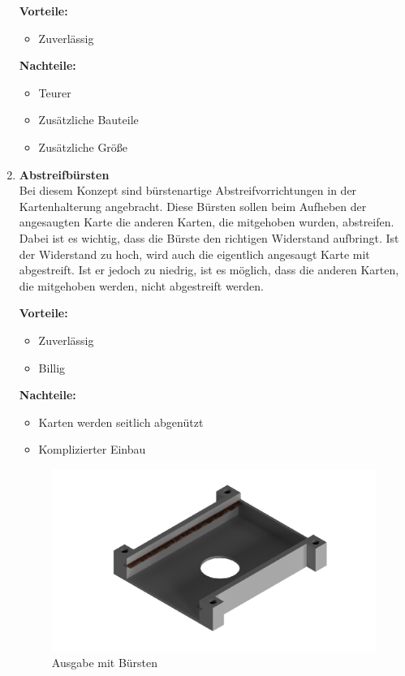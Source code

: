 \begin{enumerate}
    \textbf{Vorteile:}
    \begin{itemize}
        \item Zuverlässig
    \end{itemize}
    \textbf{Nachteile:}
    \begin{itemize}
        \item Teurer
        \item Zusätzliche Bauteile
        \item Zusätzliche Größe
    \end{itemize}



    \item \textbf{Abstreifbürsten}\\
    Bei diesem Konzept sind bürstenartige Abstreifvorrichtungen in der Kartenhalterung angebracht.
    Diese Bürsten sollen beim Aufheben der
    angesaugten Karte die anderen Karten, die mitgehoben wurden, abstreifen.
    Dabei ist es wichtig, dass die Bürste den richtigen Widerstand aufbringt.
    Ist der Widerstand zu hoch, wird auch die eigentlich angesaugt Karte mit abgestreift.
    Ist er jedoch zu niedrig, ist es möglich, dass die anderen Karten,
    die mitgehoben werden, nicht abgestreift werden.

    \textbf{Vorteile:}
    \begin{itemize}
        \item Zuverlässig
        \item Billig
    \end{itemize}
    \textbf{Nachteile:}
    \begin{itemize}
        \item Karten werden seitlich abgenützt
        \item Komplizierter Einbau
    \end{itemize}

    \begin{figure}[H]
        \includegraphics[scale=0.5,page=1]{fig/mech/AusgabeMitBuersten}
        \caption{Ausgabe mit Bürsten}
    \end{figure}


\end{enumerate}
